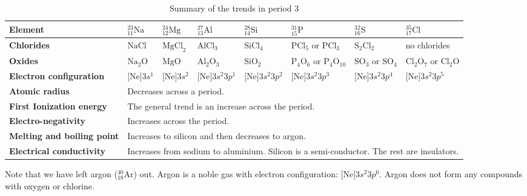 \begin{table}[H]
 \begin{center}
  \begin{tabular}{|p{2cm}|p{1cm}|p{1cm}|p{1.4cm}|p{1.4cm}|p{1.4cm}|p{1.4cm}|p{1.4cm}|} \hline
\textbf{Element} & $^{23}_{11}\text{Na}$ & $^{24}_{12}\text{Mg}$ &  $^{27}_{13}\text{Al}$ & $^{28}_{14}\text{Si}$ &  $^{31}_{15}\text{P}$ & $^{32}_{16}\text{S}$ & $^{35}_{17}\text{Cl}$ \\ \hline
   \textbf{Chlorides} & $\text{NaCl}$ & $\text{MgCl}_2$ & $\text{AlCl}_{3}$ & $\text{SiCl}_{4}$ & $\text{PCl}_{5}$ or $\text{PCl}_{3}$ & $\text{S}_{2}\text{Cl}_{2}$ & no chlorides  \\ \hline
\textbf{Oxides} & $\text{Na}_{2}\text{O}$ & $\text{MgO}$ & $\text{Al}_{2}\text{O}_{3}$ & $\text{SiO}_{2}$ & $\text{P}_{4}\text{O}_{6}$ or $\text{P}_{4}\text{O}_{10}$ & $\text{SO}_{3}$ or $\text{SO}_{4}$ & $\text{Cl}_{2}\text{O}_{7}$ or $\text{Cl}_{2}\text{O}$ \\ \hline
\textbf{Electron configuration} & $\text{[Ne]}3s^{1}$ & $\text{[Ne]}3s^{2}$ & $\text{[Ne]}3s^{2}3p^{1}$ & $\text{[Ne]}3s^{2}3p^{2}$ & $\text{[Ne]}3s^{2}3p^{3}$ & $\text{[Ne]}3s^{2}3p^{4}$ & $\text{[Ne]}3s^{2}3p^{5}$  \\ \hline
\textbf{Atomic radius} & \multicolumn{7}{p{8cm}|}{Decreases across a period.} \\ \hline
\textbf{First Ionization energy} & \multicolumn{7}{p{8cm}|}{The general trend is an increase across the period.} \\ \hline
\textbf{Electro-negativity} & \multicolumn{7}{p{8cm}|}{Increases across the period.} \\ \hline
\textbf{Melting and boiling point} & \multicolumn{7}{p{8cm}|}{Increases to silicon and then decreases to argon.} \\ \hline
\textbf{Electrical conductivity} & \multicolumn{7}{p{10cm}|}{Increases from sodium to aluminium. Silicon is a semi-conductor. The rest are insulators.} \\ \hline
  \end{tabular}
\caption{Summary of the trends in period 3}
\label{tab:period3trends}
 \end{center}

\end{table}
Note that we have left argon ($^{40}_{18}\text{Ar}$) out. Argon is a noble gas with electron configuration: $\text{[Ne]}3s^{2}3p^{6}$. Argon does not form any compounds with oxygen or chlorine. 
